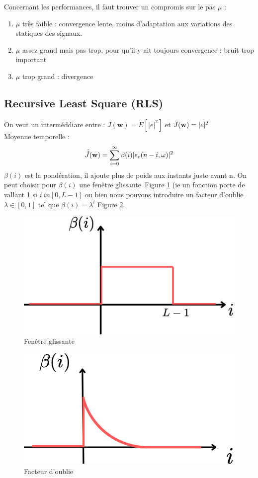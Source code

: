 \documentclass[12pt]{article}
\begin{document}
Concernant les performances, il faut trouver un compromis sur le pas $\mu$ : 
\begin{enumerate}
    \item $\mu$ très faible : convergence lente, moins d'adaptation aux variations des statiques des signaux.
    \item $\mu$ assez grand mais pas trop, pour qu'il y ait toujours convergence : bruit trop important
    \item $\mu$ trop grand : divergence
\end{enumerate}

\subsection{Recursive Least Square (RLS)}
On veut un interméddiare entre : $J(\mathbf{w}) = E \left[ |e|^2 \right]$ et $\Tilde{J}(\mathbf{w}) = |e|^2$\\
Moyenne temporelle : $$\Tilde{\Tilde{J}}(\mathbf{w}) = \sum_{i=0}^{\infty} \beta(i) |e_c(n-i,\omega)|^2$$
$\beta(i)$ est la pondération, il ajoute plus de poids aux instants juste avant n.
On peut choisir pour $\beta (i)$ une fenêtre glissante~Figure \ref{fig:porte} (ie un fonction porte de vallant 1 si $i \ in [0,L-1]$ ou bien nous pouvons introduire un facteur d'oublie $\lambda \in [0,1]$ tel que $\beta(i) = \lambda^i$ Figure \ref{fig:oublie}. 
\begin{figure}[H]
    \centering
    \includegraphics[width=0.5\linewidth]{porte.png}
    \caption{Fenêtre glissante}
    \label{fig:porte}
\end{figure}

\begin{figure}[H]
    \centering
    \includegraphics[width=0.5\linewidth]{oublie.png}
    \caption{Facteur d'oublie}
    \label{fig:oublie}
\end{figure}
\end{document}
